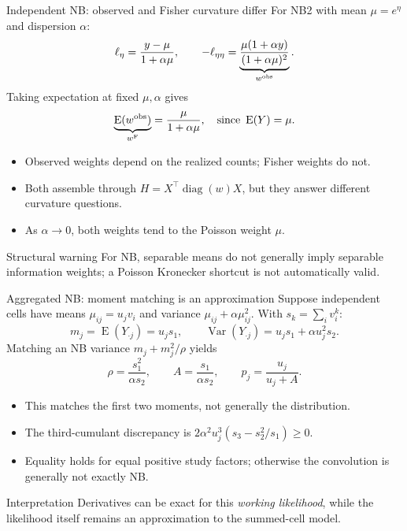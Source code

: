 \documentclass[aspectratio=169,10pt]{beamer}
\newcommand{\E}{\operatorname{E}}
\newcommand{\diag}{\operatorname{diag}}
\newcommand{\Var}{\operatorname{Var}}
\begin{document}
\begin{frame}{Independent NB: observed and Fisher curvature differ}
For NB2 with mean $\mu=e^\eta$ and dispersion $\alpha$:
\[
\ell_\eta=\frac{y-\mu}{1+\alpha\mu},\qquad
-\ell_{\eta\eta}
=\underbrace{\frac{\mu(1+\alpha y)}{(1+\alpha\mu)^2}}_
                  {w^{\rm obs}}.
\]
Taking expectation at fixed $\mu,\alpha$ gives
\[
\underbrace{\E(w^{\rm obs})}_{w^{\rm F}}
=\frac{\mu}{1+\alpha\mu},
\quad\text{since }\E(Y)=\mu.
\]
\begin{itemize}
  \item Observed weights depend on the realized counts; Fisher weights do not.
  \item Both assemble through $H=X^\top\diag(w)X$, but they answer different
        curvature questions.
  \item As $\alpha\to0$, both weights tend to the Poisson weight $\mu$.
\end{itemize}
\begin{alertblock}{Structural warning}
For NB, separable means do not generally imply separable information weights;
a Poisson Kronecker shortcut is not automatically valid.
\end{alertblock}
\end{frame}

\begin{frame}{Aggregated NB: moment matching is an approximation}
Suppose independent cells have means $\mu_{ij}=u_jv_i$ and variance
$\mu_{ij}+\alpha\mu_{ij}^2$. With
$s_k=\sum_i v_i^k$:
\[
m_j=\E(Y_{\cdot j})=u_js_1,\qquad
\Var(Y_{\cdot j})=u_js_1+\alpha u_j^2s_2.
\]
Matching an NB variance $m_j+m_j^2/\rho$ yields
\[
\rho=\frac{s_1^2}{\alpha s_2},\qquad
A=\frac{s_1}{\alpha s_2},\qquad
p_j=\frac{u_j}{u_j+A}.
\]
\begin{itemize}
  \item This matches the first two moments, not generally the distribution.
  \item The third-cumulant discrepancy is
        $2\alpha^2u_j^3(s_3-s_2^2/s_1)\geq0$.
  \item Equality holds for equal positive study factors; otherwise the
        convolution is generally not exactly NB.
\end{itemize}
\begin{block}{Interpretation}
Derivatives can be exact for this \emph{working likelihood}, while the
likelihood itself remains an approximation to the summed-cell model.
\end{block}
\end{frame}
\end{document}
